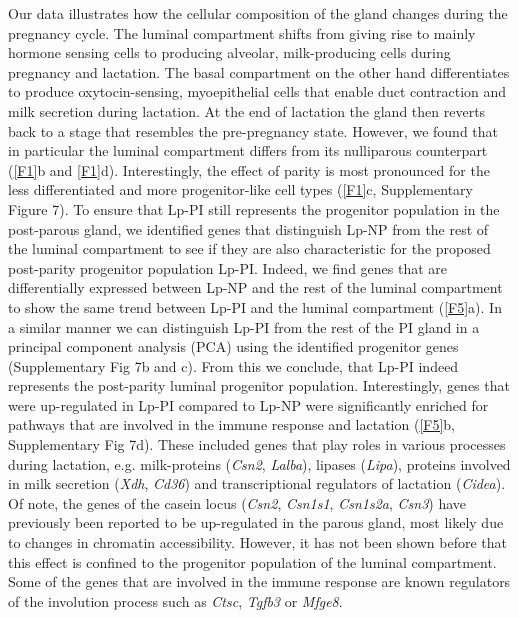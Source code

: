 \documentclass[titlepage, 12pt, oneside]{amsart}
\begin{document}
Our data illustrates how the cellular composition of the gland changes during the pregnancy cycle.
The luminal compartment shifts from giving rise to mainly hormone sensing cells to producing alveolar, milk-producing cells during pregnancy and lactation. 
The basal compartment on the other hand differentiates to produce oxytocin-sensing, myoepithelial cells that enable duct contraction and milk secretion during lactation.
At the end of lactation the gland then reverts back to a stage that resembles the pre-pregnancy state.
However, we found that in particular the luminal compartment differs from its nulliparous counterpart (\autoref{F1}b and \autoref{F1}d).
Interestingly, the effect of parity is most pronounced for the less differentiated and more progenitor-like cell types (\autoref{F1}c, Supplementary Figure 7).
To ensure that Lp-PI still represents the progenitor population in the post-parous gland, we identified genes that distinguish Lp-NP from the rest of the luminal compartment to see if they are also characteristic for the proposed post-parity progenitor population Lp-PI.
Indeed, we find genes that are differentially expressed between Lp-NP and the rest of the luminal compartment to show the same trend between Lp-PI and the luminal compartment (\autoref{F5}a).
In a similar manner we can distinguish Lp-PI from the rest of the PI gland in a principal component analysis (PCA) using the identified progenitor genes (Supplementary Fig 7b and c).
From this we conclude, that Lp-PI indeed represents the post-parity luminal progenitor population.
Interestingly, genes that were up-regulated in Lp-PI compared to Lp-NP were significantly enriched for pathways that are involved in the immune response and lactation (\autoref{F5}b, Supplementary Fig 7d).
These included genes that play roles in various processes during lactation, e.g. milk-proteins (\textit{Csn2}, \textit{Lalba}), lipases (\textit{Lipa}), proteins involved in milk secretion (\textit{Xdh}, \textit{Cd36}) and transcriptional regulators of lactation (\textit{Cidea}).
Of note, the genes of the casein locus (\textit{Csn2}, \textit{Csn1s1}, \textit{Csn1s2a}, \textit{Csn3}) have previously been reported to be up-regulated in the parous gland, most likely due to changes in chromatin accessibility\autocite{Dos2015,Rijnkels2013}.
However, it has not been shown before that this effect is confined to the progenitor population of the luminal compartment.
Some of the genes that are involved in the immune response are known regulators of the involution process such as \textit{Ctsc}, \textit{Tgfb3} or \textit{Mfge8}.
\end{document}
